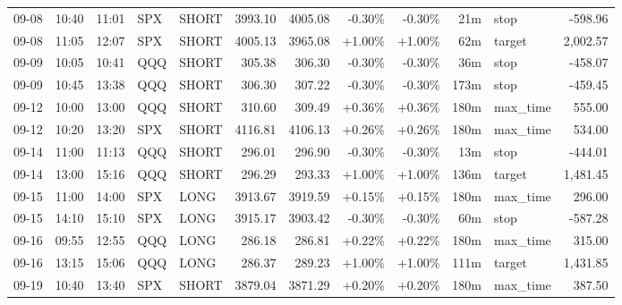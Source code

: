 \documentclass[11pt,a4paper]{article}
\begin{document}
\begin{center}
\begin{longtable}{>{\color{txtmain}}l l l l l r r r r r >{\color{txtmain}}l r}
09-08 & 10:40 & 11:01 & SPX & SHORT & 3993.10 & 4005.08 & \textcolor{lossred}{-0.30\%} & \textcolor{lossred}{-0.30\%} & 21m & stop & \textcolor{lossred}{-598.96} \\
09-08 & 11:05 & 12:07 & SPX & SHORT & 4005.13 & 3965.08 & \textcolor{wingreen}{+1.00\%} & \textcolor{wingreen}{+1.00\%} & 62m & target & \textcolor{wingreen}{2,002.57} \\
09-09 & 10:05 & 10:41 & QQQ & SHORT & 305.38 & 306.30 & \textcolor{lossred}{-0.30\%} & \textcolor{lossred}{-0.30\%} & 36m & stop & \textcolor{lossred}{-458.07} \\
09-09 & 10:45 & 13:38 & QQQ & SHORT & 306.30 & 307.22 & \textcolor{lossred}{-0.30\%} & \textcolor{lossred}{-0.30\%} & 173m & stop & \textcolor{lossred}{-459.45} \\
09-12 & 10:00 & 13:00 & QQQ & SHORT & 310.60 & 309.49 & \textcolor{wingreen}{+0.36\%} & \textcolor{wingreen}{+0.36\%} & 180m & max\_time & \textcolor{wingreen}{555.00} \\
09-12 & 10:20 & 13:20 & SPX & SHORT & 4116.81 & 4106.13 & \textcolor{wingreen}{+0.26\%} & \textcolor{wingreen}{+0.26\%} & 180m & max\_time & \textcolor{wingreen}{534.00} \\
09-14 & 11:00 & 11:13 & QQQ & SHORT & 296.01 & 296.90 & \textcolor{lossred}{-0.30\%} & \textcolor{lossred}{-0.30\%} & 13m & stop & \textcolor{lossred}{-444.01} \\
09-14 & 13:00 & 15:16 & QQQ & SHORT & 296.29 & 293.33 & \textcolor{wingreen}{+1.00\%} & \textcolor{wingreen}{+1.00\%} & 136m & target & \textcolor{wingreen}{1,481.45} \\
09-15 & 11:00 & 14:00 & SPX & LONG & 3913.67 & 3919.59 & \textcolor{wingreen}{+0.15\%} & \textcolor{wingreen}{+0.15\%} & 180m & max\_time & \textcolor{wingreen}{296.00} \\
09-15 & 14:10 & 15:10 & SPX & LONG & 3915.17 & 3903.42 & \textcolor{lossred}{-0.30\%} & \textcolor{lossred}{-0.30\%} & 60m & stop & \textcolor{lossred}{-587.28} \\
09-16 & 09:55 & 12:55 & QQQ & LONG & 286.18 & 286.81 & \textcolor{wingreen}{+0.22\%} & \textcolor{wingreen}{+0.22\%} & 180m & max\_time & \textcolor{wingreen}{315.00} \\
09-16 & 13:15 & 15:06 & QQQ & LONG & 286.37 & 289.23 & \textcolor{wingreen}{+1.00\%} & \textcolor{wingreen}{+1.00\%} & 111m & target & \textcolor{wingreen}{1,431.85} \\
09-19 & 10:40 & 13:40 & SPX & SHORT & 3879.04 & 3871.29 & \textcolor{wingreen}{+0.20\%} & \textcolor{wingreen}{+0.20\%} & 180m & max\_time & \textcolor{wingreen}{387.50} \\

\end{longtable}
\end{center}
\end{document}
